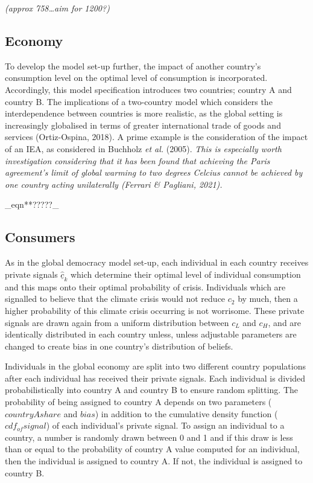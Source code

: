 \documentclass[11pt,preprint, authoryear]{elsarticle}
\numberwithin{equation}{section}
\numberwithin{figure}{section}
\numberwithin{table}{section}
\begin{document}
\emph{(approx 758\ldots aim for 1200?)}

\hypertarget{economy-1}{%
\subsection*{Economy}\label{economy-1}}

To develop the model set-up further, the impact of another country's
consumption level on the optimal level of consumption is incorporated.
Accordingly, this model specification introduces two countries; country
A and country B. The implications of a two-country model which considers
the interdependence between countries is more realistic, as the global
setting is increasingly globalised in terms of greater international
trade of goods and services (Ortiz-Ospina, 2018). A prime example is the
consideration of the impact of an IEA, as considered in Buchholz
\emph{et al.} (2005). \emph{This is especially worth investigation
considering that it has been found that achieving the Paris agreement's
limit of global warming to two degrees Celcius cannot be achieved by one
country acting unilaterally (Ferrari \& Pagliani, 2021).}

\_eqn**?????\_

\hypertarget{consumers-1}{%
\subsection*{Consumers}\label{consumers-1}}

As in the global democracy model set-up, each individual in each country
receives private signals \(\hat{\underline{c}}_k\) which determine their
optimal level of individual consumption and this maps onto their optimal
probability of crisis. Individuals which are signalled to believe that
the climate crisis would not reduce \(c_2\) by much, then a higher
probability of this climate crisis occurring is not worrisome. These
private signals are drawn again from a uniform distribution between
\(c_L\) and \(c_H\), and are identically distributed in each country
unless, unless adjustable parameters are changed to create bias in one
country's distribution of beliefs.

Individuals in the global economy are split into two different country
populations after each individual has received their private signals.
Each individual is divided probabilistically into country A and country
B to ensure random splitting. The probability of being assigned to
country A depends on two parameters (\(countryAshare\) and \(bias\)) in
addition to the cumulative density function (\(cdf_{of}signal\)) of each
individual's private signal. To assign an individual to a country, a
number is randomly drawn between 0 and 1 and if this draw is less than
or equal to the probability of country A value computed for an
individual, then the individual is assigned to country A. If not, the
individual is assigned to country B.
\end{document}
